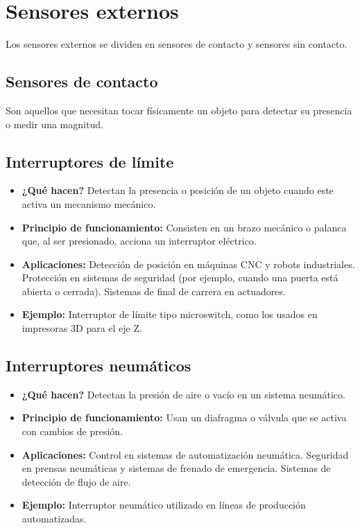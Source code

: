 \section{Sensores externos} \label{sec:sensores ecternos}
Los sensores externos se dividen en sensores de contacto y sensores sin contacto. 
\subsection{Sensores de contacto}
Son aquellos que necesitan tocar físicamente un objeto para detectar su presencia o medir una magnitud.
\subsection*{Interruptores de límite}
\begin{itemize}
	\item \textbf{¿Qué hacen?} Detectan la presencia o posición de un objeto cuando este activa un mecanismo mecánico.
	\item \textbf{Principio de funcionamiento:} Consisten en un brazo mecánico o palanca que, al ser presionado, acciona un interruptor eléctrico.
	\item \textbf{Aplicaciones:} Detección de posición en máquinas CNC y robots industriales.
	Protección en sistemas de seguridad (por ejemplo, cuando una puerta está abierta o cerrada).
	Sistemas de final de carrera en actuadores.
	\item \textbf{Ejemplo:} Interruptor de límite tipo microswitch, como los usados en impresoras 3D para el eje Z.
\end{itemize}
\subsection*{Interruptores neumáticos}
\begin{itemize}
	\item \textbf{¿Qué hacen?} Detectan la presión de aire o vacío en un sistema neumático.
	\item \textbf{Principio de funcionamiento:} Usan un diafragma o válvula que se activa con cambios de presión.
	\item \textbf{Aplicaciones:} Control en sistemas de automatización neumática.
	Seguridad en prensas neumáticas y sistemas de frenado de emergencia.
	Sistemas de detección de flujo de aire.
	\item \textbf{Ejemplo:} Interruptor neumático utilizado en líneas de producción automatizadas.
\end{itemize}
